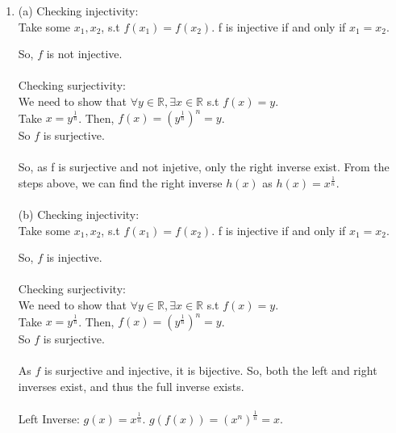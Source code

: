 \documentclass[a4paper]{article}
\begin{document}
\begin{enumerate}
\item (a) Checking injectivity:\\
Take some $x_1, x_2$, s.t $f(x_1) = f(x_2)$. f is injective if and only if $x_1 = x_2$.
So, $f$ is not injective.\\
\\
Checking surjectivity:\\
We need to show that $\forall y \in \mathbb{R}, \exists x \in \mathbb{R}$ s.t $f(x) = y$.\\
Take $x = y^{\frac{1}{n}}$. Then, $f(x) = (y^{\frac{1}{n}})^n = y$.\\
So $f$ is surjective.\\
\\
So, as f is surjective and not injetive, only the right inverse exist. From the steps above, we can find the right inverse $h(x)$ as $h(x) = x^{\frac{1}{n}}$.\\
\\
(b) Checking injectivity:\\
Take some $x_1, x_2$, s.t $f(x_1) = f(x_2)$. f is injective if and only if $x_1 = x_2$.
So, $f$ is injective.\\
\\
Checking surjectivity:\\
We need to show that $\forall y \in \mathbb{R}, \exists x \in \mathbb{R}$ s.t $f(x) = y$.\\
Take $x = y^{\frac{1}{n}}$. Then, $f(x) = (y^{\frac{1}{n}})^n = y$.\\
So $f$ is surjective.\\
\\
As $f$ is surjective and injective, it is bijective. So, both the left and right inverses exist, and thus the full inverse exists.\\
\\
Left Inverse: $g(x) = x^{\frac{1}{n}}$. $g(f(x)) = (x^n)^{\frac{1}{n}} = x$.\\

\end{enumerate}
\end{document}
